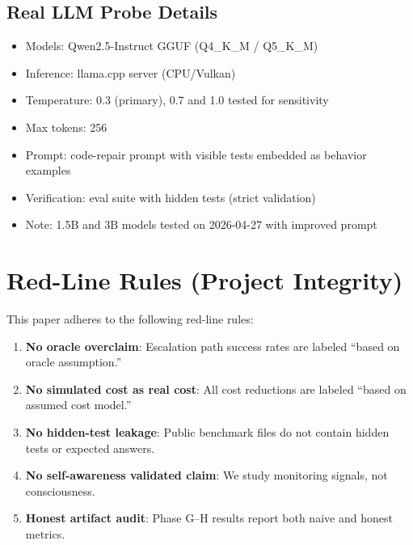 \documentclass[11pt,a4paper]{article}
\begin{document}
\subsection{Real LLM Probe Details}

\begin{itemize}
    \item Models: Qwen2.5-Instruct GGUF (Q4\_K\_M / Q5\_K\_M)
    \item Inference: llama.cpp server (CPU/Vulkan)
    \item Temperature: 0.3 (primary), 0.7 and 1.0 tested for sensitivity
    \item Max tokens: 256
    \item Prompt: code-repair prompt with visible tests embedded as behavior examples
    \item Verification: eval suite with hidden tests (strict validation)
    \item Note: 1.5B and 3B models tested on 2026-04-27 with improved prompt
\end{itemize}

\section{Red-Line Rules (Project Integrity)}

This paper adheres to the following red-line rules:

\begin{enumerate}
    \item \textbf{No oracle overclaim}: Escalation path success rates are labeled ``based on oracle assumption.''
    \item \textbf{No simulated cost as real cost}: All cost reductions are labeled ``based on assumed cost model.''
    \item \textbf{No hidden-test leakage}: Public benchmark files do not contain hidden tests or expected answers.
    \item \textbf{No self-awareness validated claim}: We study monitoring signals, not consciousness.
    \item \textbf{Honest artifact audit}: Phase G--H results report both naive and honest metrics.
\end{enumerate}
\end{document}
